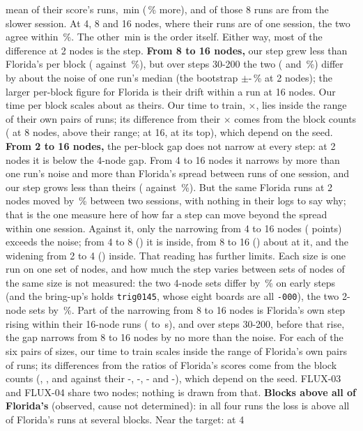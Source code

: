 mean of their score's runs, \TriFxTwoFlTpbOly\,min (\TriFxTwoFlTpbOlyPct\,\% more), and \TriFxTwoOlySlow{} of those 8 runs are from the slower session. At 4, 8 and 16 nodes, where their runs are of one session, the two agree within \TriFxScaleTpbRefHi\,\%. The other \TriFxTwoSplitOrderPart\,min is the order itself. Either way, most of the difference at 2 nodes is the step. \textbf{From 8 to 16 nodes,} our step grew less than Florida's per block (\TriFxSixteenStepScale{} against \TriFxSixteenFlStepScale\,\%), but over steps 30-200 the two (\TriFxSixteenTenScale{} and \TriFxSixteenFlTenScale\,\%) differ by about the noise of one run's median (the bootstrap $\pm$\TriFxGapBootLo-\TriFxGapBootHi\,\% at 2 nodes); the larger per-block figure for Florida is their drift within a run at 16 nodes. Our time per block scales about as theirs. Our time to train, $\times$\TriFxSixteenTttRatio, lies inside the range of their own pairs of runs; its difference from their $\times$\TriFxSixteenFlTttRatio{} comes from the block counts (\TriFxBlocks{} at 8 nodes, above their range; \TriFxSixteenBlocks{} at 16, at its top), which depend on the seed. \textbf{From 2 to 16 nodes,} the per-block gap does not narrow at every step: at 2 nodes it is below the 4-node gap. From 4 to 16 nodes it narrows by more than one run's noise and more than Florida's spread between runs of one session, and our step grows less than theirs (\TriFxScaleStepSixteenFour{} against \TriFxScaleFlStepSixteenFour\,\%). But the same Florida runs at 2 nodes moved by \TriFxScaleFlSessionPct\,\% between two sessions, with nothing in their logs to say why; that is the one measure here of how far a step can move beyond the spread within one session. Against it, only the narrowing from 4 to 16 nodes (\TriFxScaleNarrow{} points) exceeds the noise; from 4 to 8 (\TriFxScaleNarrowEightFour) it is inside, from 8 to 16 (\TriFxScaleNarrowSixteenEight) about at it, and the widening from 2 to 4 (\TriFxScaleWidenFourTwo) inside. That reading has further limits. Each size is one run on one set of nodes, and how much the step varies between sets of nodes of the same size is not measured: the two 4-node sets differ by \TriFxScaleSetsPct\,\% on early steps (and the bring-up's holds \texttt{trig0145}, whose eight boards are all \texttt{-000}), the two 2-node sets by \TriFxScaleSetsTwoPct\,\%. Part of the narrowing from 8 to 16 nodes is Florida's own step rising within their 16-node runs (\TriFxSixteenFlStepEarly{} to \TriFxSixteenFlStepLate\,s), and over steps 30-200, before that rise, the gap narrows from 8 to 16 nodes by no more than the noise. For each of the six pairs of sizes, our time to train scales inside the range of Florida's own pairs of runs; its differences from the ratios of Florida's scores come from the block counts (\TriFxTwoBlocks, \TriFxFourBlocks, \TriFxBlocks{} and \TriFxSixteenBlocks{} against their \TriFxTwoFlBlocksLo-\TriFxTwoFlBlocksHi, \TriFxFourFlBlocksLo-\TriFxFourFlBlocksHi, \TriFxFlBlocksLo-\TriFxFlBlocksHi{} and \TriFxSixteenFlBlocksLo-\TriFxSixteenFlBlocksHi), which depend on the seed. FLUX-03 and FLUX-04 share two nodes; nothing is drawn from that. \textbf{Blocks above all of Florida's} (observed, cause not determined): in all four runs the loss is above all of Florida's runs at several blocks. Near the target: at 4 